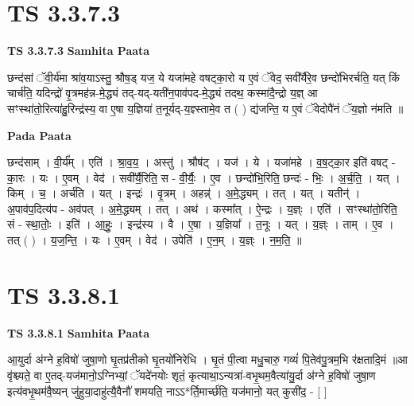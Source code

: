 \documentclass[17pt]{extarticle}
\begin{document}
\section{ TS 3.3.7.3 }

\textbf{TS 3.3.7.3 } \newline
\textbf{Samhita Paata} \newline

छन्द॑सां ॅवी॒र्य॑मा श्रा॑व॒याऽस्तु॒ श्रौष॒ड् यज॒ ये यजा॑महे वषट्का॒रो य ए॒वं ॅवेद॒ सवी᳚र्यैरे॒व छन्दो॑भिरर्चति॒ यत् किं चार्च॑ति॒ यदिन्द्रो॑ वृ॒त्रमह॑न्न-मे॒द्ध्यं तद्-यद्-यती॑न॒पाव॑पद-मे॒द्ध्यं तदथ॒ कस्मा॑दै॒न्द्रो य॒ज्ञ् आ सꣳस्था॑तो॒रित्या॑हु॒रिन्द्र॑स्य॒ वा ए॒षा य॒ज्ञिया॑ त॒नूर्यद्-य॒ज्ञ्स्तामे॒व त ( ) द्य॑जन्ति॒ य ए॒वं ॅवेदोपै॑नं ॅय॒ज्ञो न॑मति ॥ \newline

\textbf{Pada Paata} \newline

छन्द॑साम् । वी॒र्य᳚म् । एति॑ । श्रा॒व॒य॒ । अस्तु॑ । श्रौष॑ट् । यज॑ । ये । यजा॑महे । व॒ष॒ट्का॒र इति॑ वषट् - का॒रः । यः । ए॒वम् । वेद॑ । सवी᳚र्यै॒रिति॒ स - वी॒र्यैः॒ । ए॒व । छन्दो॑भि॒रिति॒ छन्दः॑ - भिः॒ । अ॒र्च॒ति॒ । यत् । किम् । च॒ । अर्च॑ति । यत् । इन्द्रः॑ । वृ॒त्रम् । अहन्न्॑ । अ॒मे॒द्ध्यम् । तत् । यत् । यतीन्॑ । अ॒पाव॑प॒दित्य॑प - अव॑पत् । अ॒मे॒द्ध्यम् । तत् । अथ॑ । कस्मा᳚त् । ऐ॒न्द्रः । य॒ज्ञ्ः । एति॑ । सꣳस्था॑तो॒रिति॒ सं - स्था॒तोः॒ । इति॑ । आ॒हुः॒ । इन्द्र॑स्य । वै । ए॒षा । य॒ज्ञिया᳚ । त॒नूः । यत् । य॒ज्ञ्ः । ताम् । ए॒व । तत् ( ) । य॒ज॒न्ति॒ । यः । ए॒वम् । वेद॑ । उपेति॑ । ए॒न॒म् । य॒ज्ञ्ः । न॒म॒ति॒ ॥  \newline





\section{ TS 3.3.8.1 }

\textbf{TS 3.3.8.1 } \newline
\textbf{Samhita Paata} \newline

आ॒युर्दा अ॑ग्ने ह॒विषो॑ जुषा॒णो घृ॒तप्र॑तीको घृ॒तयो॑निरेधि । घृ॒तं पी॒त्वा मधु॒चारु॒ गव्यं॑ पि॒तेव॑पु॒त्रम॒भि र॑क्षतादि॒मं ॥आ वृ॑श्च्यते॒ वा ए॒तद्-यज॑मानो॒ऽग्निभ्यां॒ ॅयदे॑नयोः शृतं॒ कृत्याथा॒ऽन्यत्रा॑-वभृ॒थम॒वैत्या॑यु॒र्दा अ॑ग्ने ह॒विषो॑ जुषा॒ण इत्य॑वभृ॒थम॑वै॒ष्यन् जु॑हुया॒दाहु॑त्यै॒वैनौ॑ शमयति॒ नाऽऽ*र्ति॒मार्च्छ॑ति॒ यज॑मानो॒ यत् कुसी॑द॒ - [  ] \newline
\end{document}
